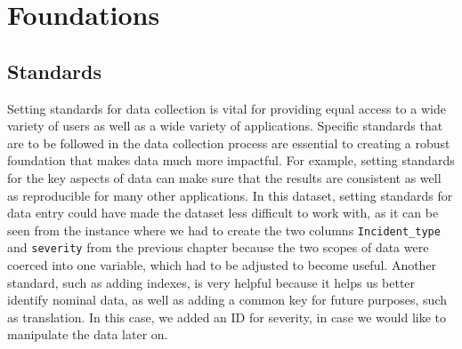 \documentclass[
]{book}
\newenvironment{Shaded}{\begin{snugshade}}{\end{snugshade}}
\newcommand{\DataTypeTok}[1]{\textcolor[rgb]{0.13,0.29,0.53}{#1}}
\newcommand{\DecValTok}[1]{\textcolor[rgb]{0.00,0.00,0.81}{#1}}
\newcommand{\KeywordTok}[1]{\textcolor[rgb]{0.13,0.29,0.53}{\textbf{#1}}}
\newcommand{\NormalTok}[1]{#1}
\newcommand{\OperatorTok}[1]{\textcolor[rgb]{0.81,0.36,0.00}{\textbf{#1}}}
\newcommand{\StringTok}[1]{\textcolor[rgb]{0.31,0.60,0.02}{#1}}
\begin{document}
\hypertarget{foundations}{%
\chapter{Foundations}\label{foundations}}

\hypertarget{standards}{%
\section{Standards}\label{standards}}

Setting standards for data collection is vital for providing equal access to a wide variety of users as well as a wide variety of applications. Specific standards that are to be followed in the data collection process are essential to creating a robust foundation that makes data much more impactful. For example, setting standards for the key aspects of data can make sure that the results are consistent as well as reproducible for many other applications. In this dataset, setting standards for data entry could have made the dataset less difficult to work with, as it can be seen from the instance where we had to create the two columns \texttt{Incident\_type} and \texttt{severity} from the previous chapter because the two scopes of data were coerced into one variable, which had to be adjusted to become useful. Another standard, such as adding indexes, is very helpful because it helps us better identify nominal data, as well as adding a common key for future purposes, such as translation. In this case, we added an ID for severity, in case we would like to manipulate the data later on.

\begin{Shaded}
\end{Shaded}
\end{document}
